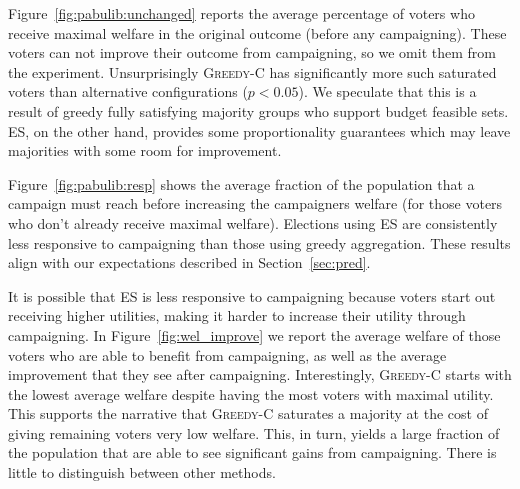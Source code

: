 \documentclass[mnsc,blindrev]{informs3_freeuse} %
\newcommand{\mes}{ES}
\newcommand{\costgreedy}{\textsc{Greedy-C}}
\begin{document}
 Figure~\ref{fig:pabulib:unchanged} reports the average percentage of voters who receive maximal welfare in the original  outcome (before any campaigning). These voters can not improve their outcome from campaigning, so we omit them from the experiment. 
 Unsurprisingly \costgreedy{} has significantly more such saturated voters than alternative configurations ($p < 0.05$). We speculate that this is a result of greedy fully satisfying majority groups who support budget feasible  sets. \mes{}, on the other hand, provides some proportionality guarantees which may leave majorities with some room for improvement. %
  

Figure~\ref{fig:pabulib:resp} shows the average fraction of the population that a campaign must reach before increasing the campaigners welfare (for those voters who don't already receive maximal welfare). Elections using \mes{} are consistently less responsive to campaigning than those using greedy aggregation.  These results align with our expectations  described in Section~\ref{sec:pred}.

It is possible that \mes{} is less responsive to campaigning because voters start out receiving higher utilities, making it harder to increase their utility through campaigning. In Figure~\ref{fig:wel_improve} we report the average welfare of those voters who are able to benefit from campaigning, as well as the average improvement  that they see after campaigning. Interestingly, \costgreedy{} starts with the lowest average welfare despite having the most voters with maximal utility. This supports the narrative that \costgreedy{} saturates a majority at the cost of giving remaining voters very low welfare. This, in turn, yields a large fraction of the population that are able to see significant gains from campaigning. There is little to distinguish between other methods. 


\end{document}
